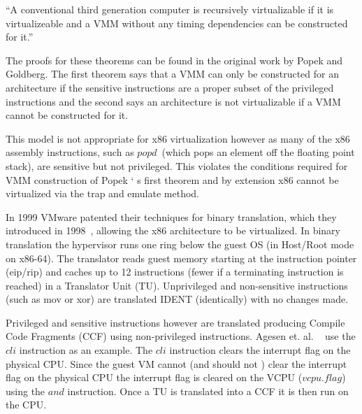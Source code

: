 \begin{theorem}
 \label{Popek II}
 {\tabularnewline
 ``A conventional third generation computer is recursively virtualizable if it is virtualizeable and a VMM without any timing dependencies can be constructed for it.'' ~\cite{popek_formal_1974}
 }
 \end{theorem}



The proofs for these theorems can be found in the original work by Popek and Goldberg. The first theorem says that a VMM can only be constructed for an architecture if the sensitive instructions are a proper subset of the privileged instructions and the second says an architecture is not virtualizable if a VMM cannot be constructed for it.  

This model is not appropriate for x86 virtualization however as many of the x86 assembly instructions, such as $popd$~\cite{_intel_2015}(which pops an element off the floating point stack),  are sensitive but not privileged. This violates the conditions required for VMM construction of Popek ` s first theorem and by extension x86 cannot be virtualized via the trap and emulate method. 

In 1999 VMware patented their techniques for binary translation, which they introduced in 1998~\cite{rosenblum_vmwareas_1999}, allowing the x86 architecture to be virtualized.  In binary translation the hypervisor runs one ring below the guest OS (in Host/Root mode on x86-64).  The translator reads guest memory starting at the instruction pointer (eip/rip) and caches up to 12 instructions (fewer if a terminating instruction is reached) in a Translator Unit (TU). Unprivileged and non-sensitive instructions (such as mov or xor) are translated IDENT (identically) with no changes made. 

Privileged and sensitive instructions however are translated producing Compile Code Fragments (CCF) using non-privileged instructions. Agesen et. al. ~\cite{agesen_evolution_2010} use the $cli$ instruction as an example. The $cli$ instruction clears the interrupt flag on the physical CPU. 
Since the guest VM cannot (and should not ) clear the interrupt flag on the physical CPU the interrupt flag is cleared on the VCPU ($vcpu.flag$) using the $and$ instruction. Once a TU is translated into a CCF it is then run on the CPU. 


